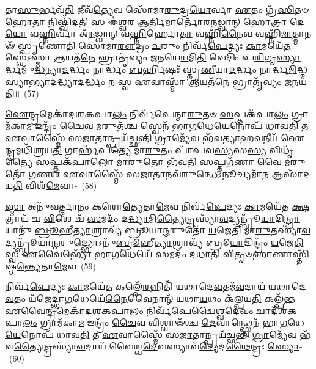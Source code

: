 𑌤𑌾\-\ul{𑌸𑍁}\-𑌰𑍍𑌭𑌵᳴\-\ul{𑌤𑌿} 𑌜𑍀𑌵᳴\-\ul{𑌤𑍍𑌯𑍇}\-𑌵 𑌸𑍋᳴𑌮𑌾\-\ul{𑌰𑍁}\-𑌦𑍍𑌰\-\ul{𑌯𑍋}\-𑌰𑍍𑌵𑌾 \ul{𑌏}\-𑌤𑌂 𑌗𑍍𑌰᳴\-\ul{𑌸𑌿}\-𑌤𑍞 𑌹𑍋\-\ul{𑌤𑌾} 𑌨𑌿𑌷𑍍𑌖𑌿᳴𑌦\-\ul{𑌤𑌿} 𑌸 𑌈॑\-\ul{𑌶𑍍𑌵}\-𑌰 𑌆\-\ul{𑌰𑍍𑌤𑌿}\-𑌮𑌾𑌰𑍍𑌤𑍋᳴𑌰\-\ul{𑌨}\-𑌡𑍍𑌵𑌾𑌨𑍍 𑌹𑍋\-\ul{𑌤𑍍𑌰𑌾} 𑌦𑍇\-\ul{𑌯𑍋} 𑌵\-\ul{𑌹𑍍𑌨𑌿}\-𑌰𑍍𑌵𑌾 𑌅᳴\-\ul{𑌨}\-𑌡𑍍𑌵𑌾𑌨𑍍 𑌵\-\ul{𑌹𑍍𑌨𑌿}\-𑌰𑍍\mbox{}𑌹𑍋\-\ul{𑌤𑌾} 𑌵𑌹𑍍𑌨𑌿᳴\-\ul{𑌨𑍈}\-𑌵 𑌵𑌹𑍍𑌨𑌿᳴\-\ul{𑌮𑌾}\-𑌤𑍍𑌮𑌾𑌨𑍟᳴ 𑌸𑍍𑌪𑍃𑌣𑍋𑌤𑌿 𑌸𑍋𑌮𑌾\-\ul{𑌰𑍗}\-𑌦𑍍𑌰𑌂 \ul{𑌚}\-𑌰𑍁𑌂 𑌨𑌿𑌰𑍍𑌵᳴\-\ul{𑌪𑍇}\-𑌦𑍍𑌯𑌃 \ul{𑌕𑌾}\-𑌮𑌯𑍇᳴\-\ul{𑌤} 𑌸𑍍𑌵𑍇॑\-𑌽𑌸𑍍𑌮𑌾 \ul{𑌆}\-𑌯𑌤᳴\-\ul{𑌨𑍇} 𑌭𑍍𑌰𑌾𑌤𑍃᳴𑌵𑍍𑌯𑌂 𑌜𑌨𑌯𑍇\-\ul{𑌯}\-𑌮𑌿\-\ul{𑌤𑌿} 𑌵𑍇𑌦𑌿𑌂᳴ 𑌪\-\ul{𑌰𑌿}\-𑌗𑍃\-\ul{𑌹𑍍𑌯𑌾}\-𑌰𑍍𑌦𑍍𑌧𑌮𑍁᳴\-\ul{𑌦𑍍𑌧}\-𑌨𑍍𑌯𑌾\-\ul{𑌦}\-𑌰𑍍𑌦𑍍𑌧𑌂 𑌨𑌾𑌰𑍍𑌦𑍍𑌧𑌂 \ul{𑌬}\-𑌰𑍍\mbox{}𑌹𑌿𑌷𑌃᳴ 𑌸𑍍𑌤𑍃\-\ul{𑌣𑍀}\-𑌯𑌾\-\ul{𑌦}\-𑌰𑍍𑌦𑍍𑌧𑌂 𑌨𑌾𑌰𑍍𑌦𑍍𑌧\-\ul{𑌮𑌿}\-𑌦𑍍𑌧𑍍𑌮𑌸𑍍𑌯𑌾॑𑌭𑍍𑌯𑌾\-\ul{𑌦}\-𑌦𑍍𑌧𑍍𑌯𑌾\-\ul{𑌦}\-𑌰𑍍𑌦𑍍𑌧𑌂 𑌨 𑌸𑍍𑌵 \ul{𑌏}\-𑌵𑌾𑌸𑍍𑌮𑌾᳴ \ul{𑌆}\-𑌯𑌤᳴\-\ul{𑌨𑍇} 𑌭𑍍𑌰𑌾𑌤𑍃᳴𑌵𑍍𑌯𑌂 𑌜𑌨𑌯𑌤𑌿॥~(57)

{\anuvakamend[{\-\ul{𑌰𑍁}\-𑌦𑍍𑌰𑍋 𑌭𑍇᳴\-\ul{𑌷}\-𑌜𑌂 \ul{𑌵𑌿}\-𑌨𑍍𑌦\-\ul{𑌤𑍇} 𑌯𑌦𑌿᳴ 𑌸𑍍𑌤𑍃\-\ul{𑌣𑍀}\-𑌯𑌾\-\ul{𑌦}\-𑌰𑍍𑌦𑍍𑌧𑌂 𑌦𑍍𑌵𑌾𑌦᳴𑌶 𑌚}]}

\-\ul{𑌐}\-𑌨𑍍𑌦𑍍𑌰𑌮𑍇𑌕𑌾᳴\-𑌦𑌶\-𑌕𑌪𑌾\-\ul{𑌲𑌂} 𑌨𑌿𑌰𑍍𑌵᳴𑌪𑍇𑌨𑍍𑌮𑌾\-\ul{𑌰𑍁}\-𑌤𑍞 \ul{𑌸}\-𑌪𑍍𑌤𑌕᳴𑌪𑌾\-\ul{𑌲𑌂} 𑌗𑍍𑌰𑌾𑌮᳴𑌕𑌾\-\ul{𑌮} 𑌇𑌨𑍍𑌦𑍍𑌰𑌂᳴ \ul{𑌚𑍈}\-𑌵 \ul{𑌮}\-𑌰𑍁𑌤᳴\-\ul{𑌶𑍍𑌚} 𑌸𑍍𑌵𑍇𑌨᳴ 𑌭𑌾\-\ul{𑌗}\-𑌧𑍇\-\ul{𑌯𑍇}\-𑌨𑍋𑌪᳴ 𑌧𑌾𑌵\-\ul{𑌤𑌿} 𑌤 \ul{𑌏}\-𑌵𑌾𑌸𑍍𑌮𑍈᳴ 𑌸\-\ul{𑌜𑌾}\-𑌤𑌾𑌨𑍍𑌪𑍍𑌰𑌯᳴𑌚𑍍𑌛𑌨𑍍𑌤𑌿 \ul{𑌗𑍍𑌰𑌾}\-𑌮𑍍𑌯𑍇᳴𑌵 𑌭᳴𑌵𑌤𑍍𑌯𑌾𑌹\-\ul{𑌵}\-𑌨𑍀𑌯᳴ \ul{𑌐}\-𑌨𑍍𑌦𑍍𑌰𑌮𑌧𑌿᳴𑌶𑍍𑌰𑌯\-\ul{𑌤𑌿} 𑌗𑌾𑌰𑍍\mbox{}𑌹᳴𑌪𑌤𑍍𑌯𑍇 𑌮𑌾\-\ul{𑌰𑍁}\-𑌤𑌂 𑌪𑌾᳴𑌪𑌵\-\ul{𑌸𑍍𑌯}\-𑌸\-\ul{𑌸𑍍𑌯} 𑌵𑌿𑌧𑍃᳴𑌤𑍍𑌯𑍈 \ul{𑌸}\-𑌪𑍍𑌤𑌕᳴𑌪𑌾𑌲𑍋 𑌮𑌾\-\ul{𑌰𑍁}\-𑌤𑍋 𑌭᳴𑌵𑌤𑌿 \ul{𑌸}\-𑌪𑍍𑌤𑌗᳴\-\ul{𑌣𑌾} 𑌵𑍈 \ul{𑌮}\-𑌰𑍁𑌤𑍋᳴ 𑌗\-\ul{𑌣}\-𑌶 \ul{𑌏}\-𑌵𑌾𑌸𑍍𑌮𑍈᳴ 𑌸\-\ul{𑌜𑌾}\-𑌤𑌾𑌨𑌵᳴\-𑌰𑍁𑌨𑍍𑌧𑍇\-𑌽\-\ul{𑌨𑍂}\-𑌚𑍍𑌯𑌮𑌾᳴\-\ul{𑌨} 𑌆𑌸𑌾᳴𑌦𑌯\-\ul{𑌤𑌿} 𑌵𑌿𑌶᳴\-\ul{𑌮𑍇}\-𑌵𑌾-~(58)

\-\ul{𑌸𑍍𑌮𑌾} 𑌅𑌨𑍁᳴𑌵𑌰𑍍𑌤𑍍𑌮𑌾𑌨𑌂 𑌕𑌰𑍋\-\ul{𑌤𑍍𑌯𑍇}\-𑌤𑌾\-\ul{𑌮𑍇}\-𑌵 𑌨𑌿𑌰𑍍𑌵᳴\-\ul{𑌪𑍇}\-𑌦𑍍𑌯𑌃 \ul{𑌕𑌾}\-𑌮𑌯𑍇᳴𑌤 \ul{𑌕𑍍𑌷}\-𑌤𑍍𑌰𑌾𑌯᳴ 𑌚 \ul{𑌵𑌿}\-𑌶𑍇 𑌚᳴ \ul{𑌸}\-𑌮𑌦𑌂᳴ 𑌦\-\ul{𑌦𑍍𑌧𑍍𑌯𑌾}\-𑌮𑌿\-\ul{𑌤𑍍𑌯𑍈}\-𑌨𑍍𑌦𑍍𑌰𑌸𑍍𑌯𑌾᳴\-\ul{𑌵}\-𑌦𑍍𑌯𑌨𑍍𑌬𑍍𑌰𑍂᳴\-\ul{𑌯𑌾}\-𑌦𑌿\-\ul{𑌨𑍍𑌦𑍍𑌰𑌾}\-𑌯𑌾𑌨𑍁᳴ \ul{𑌬𑍍𑌰𑍂}\-𑌹𑍀\-\ul{𑌤𑍍𑌯𑌾}\-𑌶𑍍𑌰𑌾𑌵𑍍𑌯᳴ 𑌬𑍍𑌰𑍂𑌯𑌾\-\ul{𑌨𑍍𑌮}\-𑌰𑍁𑌤𑍋᳴ \ul{𑌯}\-𑌜𑍇𑌤𑌿᳴ 𑌮𑌾\-\ul{𑌰𑍁}\-𑌤𑌸𑍍𑌯𑌾᳴\-\ul{𑌵}\-𑌦𑍍𑌯𑌨𑍍𑌬𑍍𑌰𑍂᳴𑌯𑌾\-\ul{𑌨𑍍𑌮}\-𑌰𑍁𑌦𑍍𑌭𑍍𑌯𑍋\-𑌽𑌨𑍁᳴\-\ul{𑌬𑍍𑌰𑍂}\-𑌹𑍀\-\ul{𑌤𑍍𑌯𑌾}\-𑌶𑍍𑌰𑌾𑌵𑍍𑌯᳴ 𑌬𑍍𑌰𑍂\-\ul{𑌯𑌾}\-𑌦𑌿𑌨𑍍𑌦𑍍𑌰𑌂᳴ \ul{𑌯}\-𑌜𑍇\-\ul{𑌤𑌿} 𑌸𑍍𑌵 \ul{𑌏}\-𑌵𑍈𑌭𑍍𑌯𑍋᳴ 𑌭𑌾\-\ul{𑌗}\-𑌧𑍇𑌯𑍇᳴ \ul{𑌸}\-𑌮𑌦𑌂᳴ 𑌦𑌧𑌾𑌤𑌿 𑌵𑌿𑌤𑍃𑍞\-\ul{𑌹𑌾}\-𑌣𑌾𑌸𑍍𑌤𑌿᳴𑌷𑍍𑌠\-\ul{𑌨𑍍𑌤𑍍𑌯𑍇}\-𑌤𑌾\-\ul{𑌮𑍇}\-𑌵~(59)

𑌨𑌿𑌰𑍍𑌵᳴\-\ul{𑌪𑍇}\-𑌦𑍍𑌯𑌃 \ul{𑌕𑌾}\-𑌮𑌯𑍇᳴\-\ul{𑌤} 𑌕𑌲𑍍𑌪𑍇᳴\-\ul{𑌰}\-𑌨𑍍𑌨𑌿𑌤𑌿᳴ 𑌯𑌥𑌾𑌦𑍇\-\ul{𑌵}\-𑌤𑌮᳴\-\ul{𑌵}\-𑌦𑌾𑌯᳴ 𑌯𑌥𑌾𑌦𑍇\-\ul{𑌵}\-𑌤𑌂 𑌯᳴𑌜𑍇𑌦𑍍𑌭𑌾\-\ul{𑌗}\-𑌧𑍇𑌯𑍇᳴\-\ul{𑌨𑍈}\-𑌵𑍈𑌨𑌾𑌨𑍍᳴ 𑌯𑌥𑌾\-\ul{𑌯}\-𑌥𑌂 𑌕᳴𑌲𑍍𑌪𑌯\-\ul{𑌤𑌿} 𑌕𑌲𑍍𑌪᳴𑌨𑍍𑌤 \ul{𑌏}\-𑌵𑍈𑌨𑍍𑌦𑍍𑌰𑌮𑍇𑌕𑌾᳴\-𑌦𑌶\-𑌕𑌪𑌾\-\ul{𑌲𑌂} 𑌨𑌿𑌰𑍍𑌵᳴𑌪𑍇𑌦𑍍𑌵𑍈𑌶𑍍𑌵\-\ul{𑌦𑍇}\-𑌵𑌂 𑌦𑍍𑌵𑌾𑌦᳴𑌶\-𑌕𑌪𑌾\-\ul{𑌲𑌂} 𑌗𑍍𑌰𑌾𑌮᳴𑌕𑌾\-\ul{𑌮} 𑌇𑌨𑍍𑌦𑍍𑌰𑌂᳴ \ul{𑌚𑍈}\-𑌵 𑌵𑌿𑌶𑍍𑌵𑌾𑍟᳴𑌶𑍍𑌚 \ul{𑌦𑍇}\-𑌵𑌾𑌨𑍍𑌥𑍍𑌸𑍍𑌵𑍇𑌨᳴ 𑌭𑌾\-\ul{𑌗}\-𑌧𑍇\-\ul{𑌯𑍇}\-𑌨𑍋𑌪᳴ 𑌧𑌾𑌵\-\ul{𑌤𑌿} 𑌤 \ul{𑌏}\-𑌵𑌾𑌸𑍍𑌮𑍈᳴ 𑌸\-\ul{𑌜𑌾}\-𑌤𑌾𑌨𑍍𑌪𑍍𑌰𑌯᳴𑌚𑍍𑌛𑌨𑍍𑌤𑌿 \ul{𑌗𑍍𑌰𑌾}\-𑌮𑍍𑌯𑍇᳴𑌵 𑌭᳴𑌵\-\ul{𑌤𑍍𑌯𑍈}\-𑌨𑍍𑌦𑍍𑌰𑌸𑍍𑌯𑌾᳴\-\ul{𑌵}\-𑌦𑌾𑌯᳴ 𑌵𑍈𑌶𑍍𑌵\-\ul{𑌦𑍇}\-𑌵𑌸𑍍𑌯𑌾𑌵᳴\-\ul{𑌦𑍍𑌯𑍇}\-𑌦\-\ul{𑌥𑍈}\-𑌨𑍍𑌦𑍍𑌰𑌃 \ul{𑌸𑍍𑌯𑍋}\--~(60)

